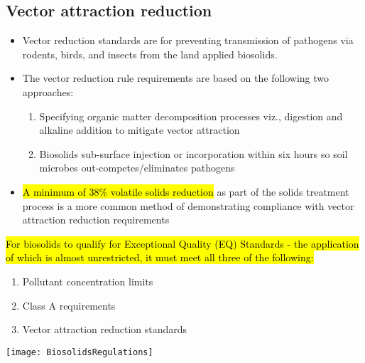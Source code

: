 \subsection{Vector attraction reduction} 
			\begin{itemize}
				\item Vector reduction standards are for preventing transmission of pathogens via rodents, birds, and insects from the land applied biosolids.
				\item The vector reduction rule requirements are based on the following two approaches: 
					\begin{enumerate}
						\item Specifying organic matter decomposition processes viz., digestion and alkaline addition to mitigate vector attraction
						\item Biosolids sub-surface injection or incorporation within six hours so soil microbes out-competes/eliminates pathogens
					\end{enumerate}
				\item \hl{A minimum of 38\% volatile solids reduction} as part of the solids treatment process is a more common method of demonstrating compliance with vector attraction reduction requirements
			\end{itemize}
		\hl{For biosolids to qualify for Exceptional Quality (EQ) Standards - the application of which is almost unrestricted, it must meet all three of the following:}
		\begin{enumerate}
			\item Pollutant concentration limits
			\item Class A requirements
			\item Vector attraction reduction standards
		\end{enumerate}
		



\begin{sidewaysfigure}[!htp]
	\begin{center}
		\texttt{[image: BiosolidsRegulations]}
	\end{center}
\end{sidewaysfigure} 


\newpage
